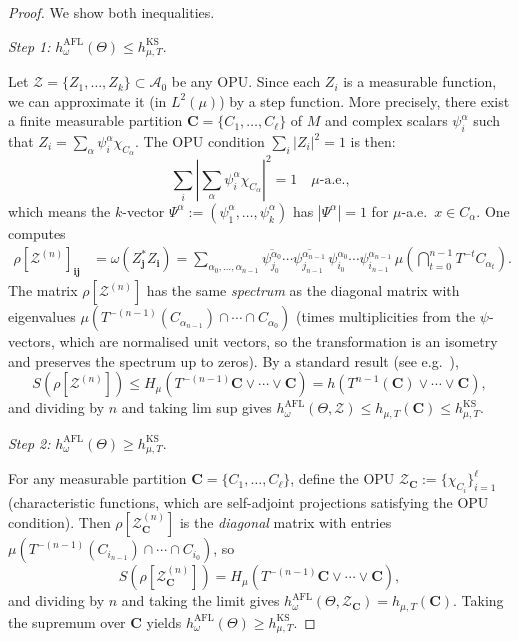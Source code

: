 \documentclass[12pt,a4paper]{article}
\newcommand{\A}{\mathcal{A}}
\begin{document}
\begin{proof}
We show both inequalities.

\medskip
\noindent\textit{Step 1: }$h_\omega^{\mathrm{AFL}}(\Theta)\leq
h_{\mu,T}^{\mathrm{KS}}$.

Let $\mathcal{Z}=\{Z_1,\ldots,Z_k\}\subset\A_0$ be any OPU. Since each $Z_i$
is a measurable function, we can approximate it (in $L^2(\mu)$) by a step
function.  More precisely, there exist a finite measurable partition
$\mathbf{C}=\{C_1,\ldots,C_\ell\}$ of $M$ and complex scalars $\psi_i^\alpha$
such that $Z_i=\sum_\alpha\psi_i^\alpha\chi_{C_\alpha}$.  The OPU condition
$\sum_i|Z_i|^2=1$ is then:
\[
  \sum_i\left|\sum_\alpha\psi_i^\alpha\chi_{C_\alpha}\right|^2 = 1
  \quad\mu\text{-a.e.,}
\]
which means the $k$-vector $\Psi^\alpha:=(\psi_1^\alpha,\ldots,\psi_k^\alpha)$
has $|\Psi^\alpha|=1$ for $\mu$-a.e.~$x\in C_\alpha$.  One computes
\begin{align*}
  \rho[\mathcal{Z}^{(n)}]_{\mathbf{i}\mathbf{j}}
  &= \omega\!\left(Z_{\mathbf{j}}^* Z_{\mathbf{i}}\right)
   = \sum_{\alpha_0,\ldots,\alpha_{n-1}}
     \overline{\psi_{j_0}^{\alpha_0}}\cdots\overline{\psi_{j_{n-1}}^{\alpha_{n-1}}}
     \,\psi_{i_0}^{\alpha_0}\cdots\psi_{i_{n-1}}^{\alpha_{n-1}}\,
     \mu\!\left(\bigcap_{t=0}^{n-1}T^{-t}C_{\alpha_t}\right).
\end{align*}
The matrix $\rho[\mathcal{Z}^{(n)}]$ has the same \emph{spectrum} as the
diagonal matrix with eigenvalues
$\mu\!\left(T^{-(n-1)}(C_{\alpha_{n-1}})\cap\cdots\cap C_{\alpha_0}\right)$
(times multiplicities from the $\psi$-vectors, which are normalised unit
vectors, so the transformation is an isometry and preserves the spectrum up to
zeros).  By a standard result (see e.g.\ \cite[formula (2.4)]{alicki1994}),
\[
  S\!\left(\rho[\mathcal{Z}^{(n)}]\right)
  \leq H_\mu(T^{-(n-1)}\mathbf{C}\vee\cdots\vee\mathbf{C})
     = h\!\left(T^{n-1}(\mathbf{C})\vee\cdots\vee\mathbf{C}\right),
\]
and dividing by $n$ and taking lim sup gives
$h_\omega^{\mathrm{AFL}}(\Theta,\mathcal{Z})\leq h_{\mu,T}(\mathbf{C})
\leq h_{\mu,T}^{\mathrm{KS}}$.

\medskip
\noindent\textit{Step 2: }$h_\omega^{\mathrm{AFL}}(\Theta)\geq
h_{\mu,T}^{\mathrm{KS}}$.

For any measurable partition $\mathbf{C}=\{C_1,\ldots,C_\ell\}$, define the
OPU $\mathcal{Z}_{\mathbf{C}}:=\{\chi_{C_i}\}_{i=1}^\ell$ (characteristic
functions, which are self-adjoint projections satisfying the OPU condition).
Then $\rho[\mathcal{Z}_{\mathbf{C}}^{(n)}]$ is the \emph{diagonal} matrix with
entries $\mu(T^{-(n-1)}(C_{i_{n-1}})\cap\cdots\cap C_{i_0})$, so
\[
  S\!\left(\rho[\mathcal{Z}_{\mathbf{C}}^{(n)}]\right)
  = H_\mu\!\left(T^{-(n-1)}\mathbf{C}\vee\cdots\vee\mathbf{C}\right),
\]
and dividing by $n$ and taking the limit gives
$h_\omega^{\mathrm{AFL}}(\Theta,\mathcal{Z}_{\mathbf{C}})=h_{\mu,T}(\mathbf{C})$.
Taking the supremum over $\mathbf{C}$ yields $h_\omega^{\mathrm{AFL}}(\Theta)
\geq h_{\mu,T}^{\mathrm{KS}}$.
\end{proof}
\end{document}
